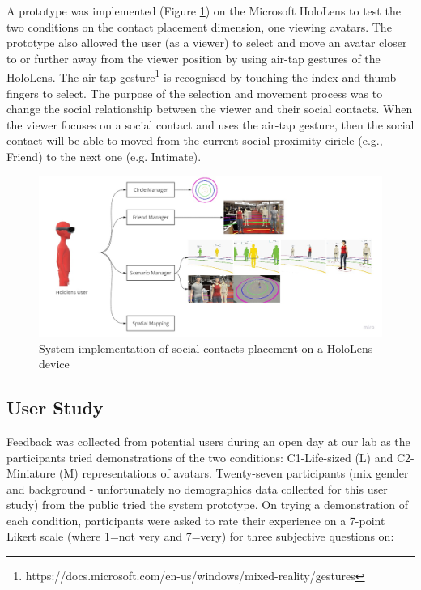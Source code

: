 A prototype was implemented (Figure \ref{fig:placement:system}) on the Microsoft HoloLens to test the two conditions on the contact placement dimension, one viewing avatars. The prototype also allowed the user (as a viewer) to select and move an avatar closer to or further away from the viewer position by using air-tap gestures of the HoloLens. The air-tap gesture\footnote{https://docs.microsoft.com/en-us/windows/mixed-reality/gestures} is recognised by touching the index and thumb fingers to select. The purpose of the selection and movement process was to change the social relationship between the viewer and their social contacts. When the viewer focuses on a social contact and uses the air-tap gesture, then the social contact will be able to moved from the current social proximity ciricle (e.g., Friend) to the next one (e.g. Intimate). 

\begin{figure}[ht]
    \centering
    \includegraphics[width=\linewidth]{images/42-placement-ismar17/placement-system.jpg}   
    \caption{System implementation of social contacts placement on a HoloLens device} 
    \label{fig:placement:system}
\end{figure}


\subsection{User Study}

Feedback was collected from potential users during an open day at our lab as the participants tried demonstrations of the two conditions: C1-Life-sized (L) and C2-Miniature (M) representations of avatars. Twenty-seven participants (mix gender and background - unfortunately no demographics data collected for this user study) from the public  tried the system prototype. On trying a demonstration of each condition, participants were asked to rate their experience on a 7-point Likert scale (where 1=not very and 7=very) for three subjective questions on: 


